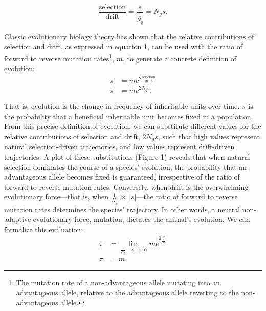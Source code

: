 \documentclass[twocolumn]{article}
\begin{document}
\begingroup
\large
\begin{equation}
    \frac{\text{selection}}{\text{drift}} = \frac{s}{\frac{1}{N_g}} = N_g s.
\end{equation}
\endgroup

Classic evolutionary biology theory\cite{kimura1983neutral, Lynch_2007} has shown that the relative contributions of selection and drift, as expressed in equation 1, can be used with the ratio of forward to reverse mutation rates\footnote{The mutation rate of a non-advantageous allele mutating into an advantageous allele, relative to the advantageous allele reverting to the non-advantageous allele.}, $m$, to generate a concrete definition of evolution: 
\begingroup
\large
\begin{equation}
\begin{split}
    \pi & = m e^{2 \frac{\text{selection}}{\text{drift}}} \\
    \pi & = m e^{2N_g s}.
\end{split}
\end{equation}
\endgroup

That is, evolution is the change in frequency of inheritable units over time. $\pi$ is the probability that a beneficial inheritable unit becomes fixed in a population. From this precise definition of evolution, we can substitute different values for the relative contributions of selection and drift, $2N_g s$, such that high values represent natural selection-driven trajectories, and low values represent drift-driven trajectories. A plot of these substitutions (Figure 1) reveals that when natural selection dominates the course of a species' evolution, the probability that an advantageous allele becomes fixed is guaranteed, irrespective of the ratio of forward to reverse mutation rates. Conversely, when drift is the overwhelming evolutionary force---that is, when $\frac{1}{N_g} \gg |s|$---the ratio of forward to reverse mutation rates determines the species' trajectory. In other words, a neutral non-adaptive evolutionary force, mutation, dictates the animal's evolution. We can formalize this evaluation:
\begingroup
\large
\begin{equation}
\begin{split}
    \pi & = \lim_{\frac{1}{N_g} - s \to \infty} m e^{2 \frac{s}{\frac{1}{N_g}}} \\
    \pi & = m.
\end{split}
\end{equation}
\endgroup
\end{document}
